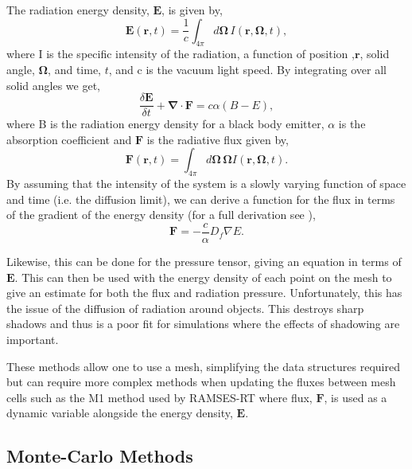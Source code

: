 The radiation energy density, $\bm{E}$, is given by,
\begin{equation}
    \bm{E}(\bm{r}, t) = \frac{1}{c}\int_{4\pi} d\bm{\Omega}\, I(\bm{r}, \bm{\Omega}, t),
\end{equation}
where I is the specific intensity of the radiation, a function of position ,$\bm{r}$, solid angle, $\bm{\Omega}$, and time, $t$, and c is the vacuum light speed. By integrating over all solid angles we get,
\begin{equation}
    \frac{\delta \bm{E}}{\delta t} + \bm{\nabla\cdot F} = c\alpha (B - E),
\end{equation}
where B is the radiation energy density for a black body emitter, $\alpha$ is the absorption coefficient and $\bm{F}$ is the radiative flux given by,
\begin{equation}
    \bm{F}(\bm{r}, t) = \int_{4\pi} d\bm{\Omega}\,\bm{\Omega}I(\bm{r}, \bm{\Omega}, t).
\end{equation}
By assuming that the intensity of the system is a slowly varying function of space and time (i.e. the diffusion limit), we can derive a function for the flux in terms of the gradient of the energy density (for a full derivation see \citet{FLD}),
\begin{equation}
    \bm{F} = -\frac{c}{\alpha}D_f\nabla E.
\end{equation}

Likewise, this can be done for the pressure tensor, giving an equation in terms of $\textbf{E}$. This can then be used with the energy density of each point on the mesh to give an estimate for both the flux and radiation pressure. Unfortunately, this has the issue of the diffusion of radiation around objects. This destroys sharp shadows and thus is a poor fit for simulations where the effects of shadowing are important.

These methods allow one to use a mesh, simplifying the data structures required but can require more complex methods when updating the fluxes between mesh cells such as the M1 method used by RAMSES-RT \citep{ramses} where flux, $\bm{F}$, is used as a dynamic variable alongside the energy density, $\bm{E}$.

\subsection{Monte-Carlo Methods}


